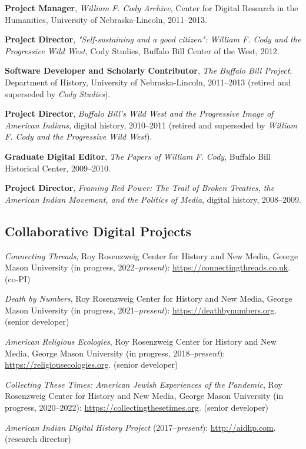 \documentclass[10pt]{article}
\begin{document}
\textbf{Project Manager}, \textit{William F. Cody Archive}, Center for Digital Research in the Humanities, University of Nebraska-Lincoln, 2011--2013.

\textbf{Project Director}, \textit{"Self-sustaining and a good citizen": William F. Cody and the Progressive Wild West}, Cody Studies, Buffalo Bill Center of the West, 2012.

\textbf{Software Developer and Scholarly Contributor}, \textit{The Buffalo Bill Project}, Department of History, University of Nebraska-Lincoln, 2011--2013 (retired and superseded by \textit{Cody Studies}).

\textbf{Project Director}, \textit{Buffalo Bill's Wild West and the Progressive Image of American Indians}, digital history, 2010--2011 (retired and superseded by \textit{William F. Cody and the Progressive Wild West}).

\textbf{Graduate Digital Editor}, \textit{The Papers of William F. Cody}, Buffalo Bill Historical Center, 2009--2010.

\textbf{Project Director}, \textit{Framing Red Power: The Trail of Broken Treaties, the American Indian Movement, and the Politics of Media}, digital history, 2008--2009.

\subsection{Collaborative Digital Projects}

\textit{Connecting Threads}, Roy Rosenzweig Center for History and New Media, George Mason University (in progress, 2022--\textit{present}): \url{https://connectingthreads.co.uk}. (co-PI)

\textit{Death by Numbers}, Roy Rosenzweig Center for History and New Media, George Mason University (in progress, 2021--\textit{present}): \url{https://deathbynumbers.org}. (senior developer)

\textit{American Religious Ecologies}, Roy Rosenzweig Center for History and New Media, George Mason University (in progress, 2018--\textit{present}): \url{https://religiousecologies.org}. (senior developer)

\textit{Collecting These Times: American Jewish Experiences of the Pandemic}, Roy Rosenzweig Center for History and New Media, George Mason University (in progress, 2020--2022): \url{https://collectingthesetimes.org}. (senior developer)

\textit{American Indian Digital History Project} (2017--\textit{present}): \url{http://aidhp.com}. (research director)
\end{document}
